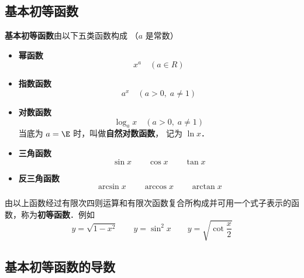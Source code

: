 

\subsection{基本初等函数}
\textbf{基本初等函数}由以下五类函数构成 （$a$ 是常数）

\begin{itemize}
\item \textbf{幂函数}
\begin{equation}\label{FunDer_eq3}
x^a \quad(a \in R)
\end{equation}
\item \textbf{指数函数}
\begin{equation}
a^x \quad(a > 0, \; a \ne 1)
\end{equation}
\item \textbf{对数函数}
\begin{equation}
\log_a x \quad(a > 0, \; a \ne 1)
\end{equation}
当底为 $a = \E$ 时，叫做\textbf{自然对数函数}， 记为 $\ln x$．
\item \textbf{三角函数}
\begin{equation}
\sin x \qquad  \cos x \qquad \tan x
\end{equation}
\item \textbf{反三角函数}
\begin{equation}
\arcsin x  \qquad \arccos x  \qquad \arctan x
\end{equation}
\end{itemize}

由以上函数经过有限次四则运算和有限次函数复合所构成并可用一个式子表示的函数，称为\textbf{初等函数}．例如
\begin{equation}
y = \sqrt{1 - x^2}\qquad y = \sin ^2 x\qquad y = \sqrt{\cot \frac{x}{2}} 
\end{equation}

\subsection{基本初等函数的导数}

